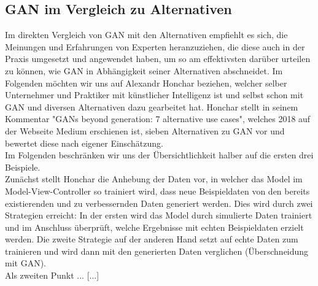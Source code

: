 \documentclass[11pt]{article}
\begin{document}
\subsection{GAN im Vergleich zu Alternativen}
Im direkten Vergleich von GAN mit den Alternativen empfiehlt es sich, die Meinungen und Erfahrungen von Experten heranzuziehen, die diese auch in der Praxis umgesetzt und angewendet haben, um so am effektivsten darüber urteilen zu können, wie GAN in Abhängigkeit seiner Alternativen abschneidet. Im Folgenden möchten wir uns auf Alexandr Honchar beziehen, welcher selber Unternehmer und Praktiker mit künstlicher Intelligenz ist und selbst schon mit GAN und diversen Alternativen dazu gearbeitet hat. Honchar stellt in seinem Kommentar "GANs beyond generation: 7 alternative use cases", welches 2018 auf der Webseite Medium erschienen ist, sieben Alternativen zu GAN vor und bewertet diese nach eigener Einschätzung.\\ Im Folgenden beschränken wir uns der Übersichtlichkeit halber auf die ersten drei Beispiele. \\Zunächst stellt Honchar die Anhebung der Daten vor, in welcher das Model im Model-View-Controller so trainiert wird, dass neue Beispieldaten von den bereits existierenden und zu verbessernden Daten generiert werden. Dies wird durch zwei Strategien erreicht: In der ersten wird das Model durch simulierte Daten trainiert und im Anschluss überprüft, welche Ergebnisse mit echten Beispieldaten erzielt werden. Die zweite Strategie auf der anderen Hand setzt auf echte Daten zum trainieren und wird dann mit den generierten Daten verglichen (Überschneidung mit GAN). \\ Als zweiten Punkt ... [...]
\end{document}
